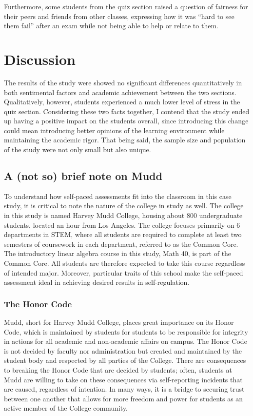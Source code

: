 Furthermore, some students from the quiz section raised a question of fairness for their peers and friends from other classes, expressing how it was ``hard to see them fail'' after an exam while not being able to help or relate to them.

\section{Discussion}

The results of the study were showed no significant differences quantitatively in both sentimental factors and academic achievement between the two sections. Qualitatively, however, students experienced a much lower level of stress in the quiz section. Considering these two facts together, I contend that the study ended up having a positive impact on the students overall, since introducing this change could mean introducing better opinions of the learning environment while maintaining the academic rigor. That being said, the sample size and population of the study were not only small but also unique.

\subsection{A (not so) brief note on Mudd}
To understand how self-paced assessments fit into the classroom in this case study, it is critical to note the nature of the college in study as well. The college in this study is named Harvey Mudd College, housing about 800 undergraduate students, located an hour from Los Angeles. The college focuses primarily on 6 departments in STEM, where all students are required to complete at least two semesters of coursework in each department, referred to as the Common Core. The introductory linear algebra course in this study, Math 40, is part of the Common Core. All students are therefore expected to take this course regardless of intended major. Moreover, particular traits of this school make the self-paced assessment ideal in achieving desired results in self-regulation.

\subsubsection{The Honor Code}
Mudd, short for Harvey Mudd College, places great importance on its Honor Code, which is maintained by students for students to be responsible for integrity in actions for all academic and non-academic affairs on campus. The Honor Code is not decided by faculty nor administration but created and maintained by the student body and respected by all parties of the College. There are consequences to breaking the Honor Code that are decided by students; often, students at Mudd are willing to take on these consequences via self-reporting incidents that are caused, regardless of intention. In many ways, it is a bridge to securing trust between one another that allows for more freedom and power for students as an active member of the College community.

